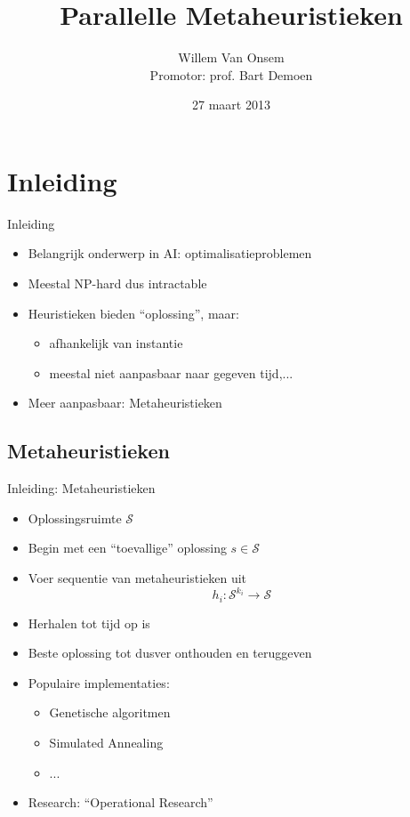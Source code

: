 \documentclass[handout]{beamer}
\title{Parallelle Metaheuristieken}
\author{Willem Van Onsem\\Promotor: prof. Bart Demoen}
\date{27 maart 2013}
\newcommand{\sol}{\mathcal{S}}
\begin{document}
\begin{frame}
\maketitle
\end{frame}
\begin{frame}
\tableofcontents
\end{frame}
\section{Inleiding}
\begin{frame}{Inleiding}
\begin{itemize}[<+->]
 \item Belangrijk onderwerp in AI: optimalisatieproblemen
 \item Meestal NP-hard dus intractable
 \item Heuristieken bieden ``oplossing'', maar:
 \begin{itemize}[<+->]
  \item afhankelijk van instantie
  \item meestal niet aanpasbaar naar gegeven tijd,...
 \end{itemize}
 \item Meer aanpasbaar: Metaheuristieken
\end{itemize}
\end{frame}
\subsection{Metaheuristieken}
\begin{frame}{Inleiding: Metaheuristieken}
\begin{itemize}[<+->]
 \item Oplossingsruimte $\sol$
 \item Begin met een ``toevallige'' oplossing $s\in\sol$
 \item Voer sequentie van metaheuristieken uit
 \begin{equation}
  h_i:\sol^{k_i}\rightarrow\sol
 \end{equation}
 \item Herhalen tot tijd op is
 \item Beste oplossing tot dusver onthouden en teruggeven
 \item Populaire implementaties:
 \begin{itemize}[<+->]
   \item Genetische algoritmen
   \item Simulated Annealing
   \item ...
 \end{itemize}
 \item Research: ``Operational Research''
\end{itemize}
\end{frame}
\end{document}
